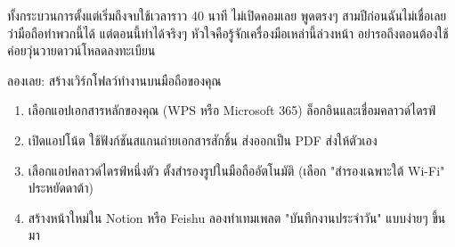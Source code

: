 ทั้งกระบวนการตั้งแต่เริ่มถึงจบใช้เวลาราว 40 นาที ไม่เปิดคอมเลย พูดตรงๆ สามปีก่อนฉันไม่เชื่อเลยว่ามือถือทำพวกนี้ได้ แต่ตอนนี้ทำได้จริงๆ หัวใจคือรู้จักเครื่องมือเหล่านี้ล่วงหน้า อย่ารอถึงตอนต้องใช้ค่อยวุ่นวายดาวน์โหลดลงทะเบียน

\begin{tcbpractice}{ลองเลย: สร้างเวิร์กโฟลว์ทำงานบนมือถือของคุณ}
\begin{enumerate}
  \item เลือกแอปเอกสารหลักของคุณ (WPS หรือ Microsoft 365) ล็อกอินและเชื่อมคลาวด์ไดรฟ์
  \item เปิดแอปโน้ต ใช้ฟังก์ชันสแกนถ่ายเอกสารสักชิ้น ส่งออกเป็น PDF ส่งให้ตัวเอง
  \item เลือกแอปคลาวด์ไดรฟ์หนึ่งตัว ตั้งสำรองรูปในมือถืออัตโนมัติ (เลือก "สำรองเฉพาะใต้ Wi-Fi" ประหยัดดาต้า)
  \item สร้างหน้าใหม่ใน Notion หรือ Feishu ลองทำเทมเพลต "บันทึกงานประจำวัน" แบบง่ายๆ ขึ้นมา
\end{enumerate}

\end{tcbpractice}

